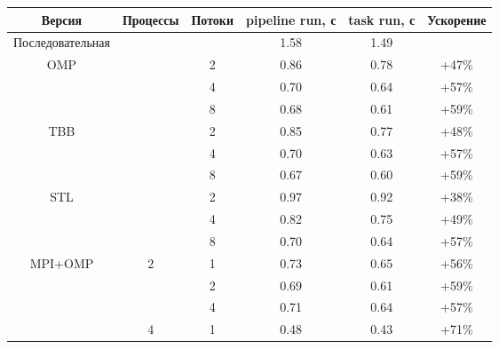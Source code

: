 \documentclass[12pt]{article}
\begin{document}
\begin{table}[H]
\centering
\begin{tabular}{|c|c|c|c|c|c|}
\hline
\textbf{Версия}   & \textbf{Процессы} & \textbf{Потоки} & \textbf{pipeline run, с} & \textbf{task run, с} & \textbf{Ускорение} \\
\hline
\multirow{1}{*}{Последовательная}  &              &                  & 1.58                  & 1.49               & \\
\hline
\multirow{3}{*}{OMP}               &              & 2                & 0.86                  & 0.78               & +47\% \\
                                   &              & 4                & 0.70                  & 0.64               & +57\% \\
                                   &              & 8                & 0.68                  & 0.61               & +59\% \\
\hline
\multirow{3}{*}{TBB}               &              & 2                & 0.85                  & 0.77               & +48\% \\
                                   &              & 4                & 0.70                  & 0.63               & +57\% \\
                                   &              & 8                & 0.67                  & 0.60               & +59\% \\
\hline
\multirow{3}{*}{STL}               &              & 2                & 0.97                  & 0.92               & +38\% \\
                                   &              & 4                & 0.82                  & 0.75               & +49\% \\
                                   &              & 8                & 0.70                  & 0.64               & +57\% \\
\hline
\multirow{9}{*}{MPI+OMP}    & \multirow{3}{*}{2}  & 1                & 0.73                  & 0.65               & +56\% \\
                            &                     & 2                & 0.69                  & 0.61               & +59\% \\
                            &                     & 4                & 0.71                  & 0.64               & +57\% \\
\cline{2-6}
                            & \multirow{3}{*}{4}  & 1                & 0.48                  & 0.43               & +71\% \\

\end{tabular}
\end{table}
\end{document}
